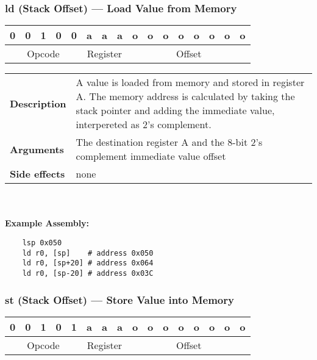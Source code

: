 \documentclass[titlepage]{article}
\begin{document}
\subsubsection{ld (Stack Offset) --- Load Value from Memory}\begin{center}
\begin{tabular}{|c|c|c|c|c|c|c|c|c|c|c|c|c|c|c|c|}
\hline
0 & 0 & 1 & 0 & 0 & a & a & a & o & o & o & o & o & o & o & o \\
\hline
\multicolumn{5}{|c}{Opcode} &
\multicolumn{3}{|c}{Register} &
\multicolumn{8}{|c|}{Offset} \\
\hline
\end{tabular}
\end{center}

\begin{tabular}{l p{8cm}}
{\bf Description} & A value is loaded from memory and stored in register A. The memory address is calculated by taking the stack pointer and adding the immediate value, interpereted as 2's complement. \\
{\bf Arguments} & The destination register A and the 8-bit 2's complement immediate value offset \\
{\bf Side effects} & none \\
\end{tabular}\\ \\
{\bf Example Assembly:}
\begin{verbatim}
    lsp 0x050
    ld r0, [sp]    # address 0x050
    ld r0, [sp+20] # address 0x064
    ld r0, [sp-20] # address 0x03C
\end{verbatim}

\subsubsection{st (Stack Offset) --- Store Value into Memory}\begin{center}
\begin{tabular}{|c|c|c|c|c|c|c|c|c|c|c|c|c|c|c|c|}
\hline
0 & 0 & 1 & 0 & 1 & a & a & a & o & o & o & o & o & o & o & o \\
\hline
\multicolumn{5}{|c}{Opcode} &
\multicolumn{3}{|c}{Register} &
\multicolumn{8}{|c|}{Offset} \\
\hline
\end{tabular}
\end{center}
\end{document}
